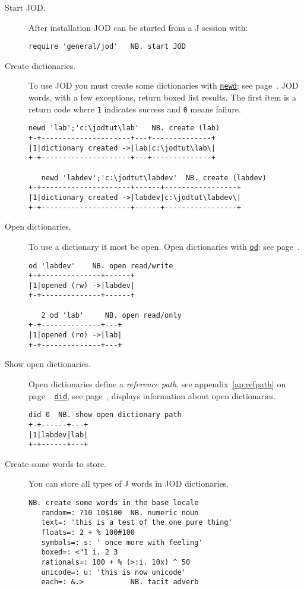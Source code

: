\begin{description}
\item[Start JOD.]  After installation JOD can be started from a J session with:
\begin{lstlisting}[frame=single,framerule=0pt]
   require 'general/jod'   NB. start JOD 
\end{lstlisting}


\item[Create dictionaries.] To use JOD you must create some dictionaries
with \hyperlink{il:newd}{\texttt{newd}}: see page~\pageref{ss:newd}.
JOD words, with a few exceptions, return boxed list results.  The first
item is a return code where \texttt{1} indicates success and \texttt{0} means failure.
\begin{lstlisting}[frame=single,framerule=0pt]
   newd 'lab';'c:\jodtut\lab'   NB. create (lab)
+-+---------------------+---+--------------+
|1|dictionary created ->|lab|c:\jodtut\lab\|
+-+---------------------+---+--------------+

   newd 'labdev';'c:\jodtut\labdev'  NB. create (labdev)
+-+---------------------+------+-----------------+
|1|dictionary created ->|labdev|c:\jodtut\labdev\|
+-+---------------------+------+-----------------+
\end{lstlisting}

\item[Open dictionaries.] To use a dictionary it most be open. Open
dictionaries with \hyperlink{il:odd}{\texttt{od}}: see page~\pageref{ss:od}.
\begin{lstlisting}[frame=single,framerule=0pt] 
   od 'labdev'    NB. open read/write
+-+--------------+------+
|1|opened (rw) ->|labdev|
+-+--------------+------+
 
   2 od 'lab'     NB. open read/only
+-+--------------+---+
|1|opened (ro) ->|lab|
+-+--------------+---+
\end{lstlisting}

\item[Show open dictionaries.] Open dictionaries define a \emph{reference path}, see
appendix~\ref{ap:refpath} on page~\pageref{ap:refpath}. \hyperlink{il:did}{\texttt{did}}, see page~\pageref{ss:did}, displays information about open dictionaries.
\begin{lstlisting}[frame=single,framerule=0pt]
   did 0  NB. show open dictionary path
+-+------+---+
|1|labdev|lab|
+-+------+---+
\end{lstlisting}

\item[Create some words to store.] You can store all types of J words
in JOD dictionaries.
\begin{lstlisting}[frame=single,framerule=0pt]
   NB. create some words in the base locale
   random=: ?10 10$100  NB. numeric noun
   text=: 'this is a test of the one pure thing'
   floats=: 2 + % 100#100
   symbols=: s: ' once more with feeling'
   boxed=: <"1 i. 2 3
   rationals=: 100 + % (>:i. 10x) ^ 50
   unicode=: u: 'this is now unicode'
   each=: &.>           NB. tacit adverb
   

\end{lstlisting}
\end{description}
